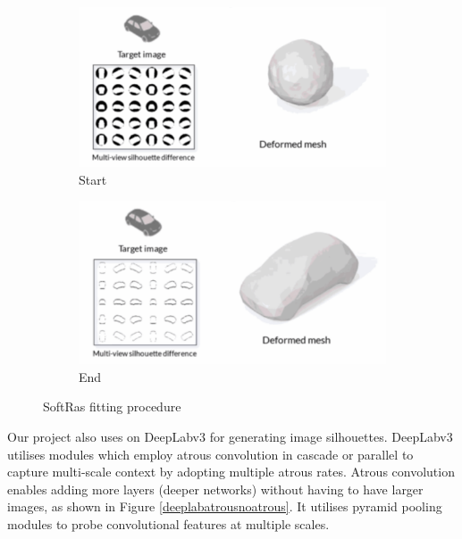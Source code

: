 \documentclass{article}
\begin{document}
\begin{figure}[h!]
  \centering
  \begin{subfigure}{0.45\textwidth}
    \centering
    \includegraphics[width=\textwidth]{images/softrasinit.png}
    \caption{Start}
    \label{softrasstart}
  \end{subfigure}
  \hfill
  \begin{subfigure}{0.45\textwidth}
    \centering
    \includegraphics[width=\textwidth]{images/softrasresults.png}
    \caption{End}
    \label{softrasend}
  \end{subfigure}
  \caption{SoftRas fitting procedure \parencite{softras}}
  \label{softrasresults}
\end{figure}

Our project also uses on DeepLabv3 \parencite{deeplab} for generating image silhouettes. DeepLabv3 utilises modules which employ atrous convolution in cascade or parallel to capture multi-scale context by adopting multiple atrous rates. Atrous convolution enables adding more layers (deeper networks) without having to have larger images, as shown in Figure \ref{deeplabatrousnoatrous}. It utilises pyramid pooling modules to probe convolutional features at multiple scales.
\end{document}
